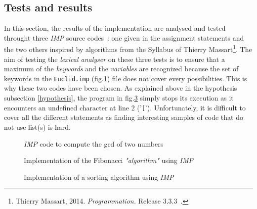 \documentclass[a4paper,11pt]{article}
\begin{document}
  \subsection{Tests and results}
    \label{subsec:testscanner}
    In this section, the results of the implementation are analysed and tested throught three \textit{IMP} source codes~: one given in the assignment statements and the two others inspired by algorithms from the Syllabus of Thierry Massart\footnote{Thierry Massart, 2014. \textit{Programmation.} Release 3.3.3~.}. The aim of testing the \textit{lexical analyser} on these three tests is to ensure that a maximum of the \textit{keywords} and the \textit{variables} are recognized because the set of keywords in the \verb|Euclid.imp| (fig.\ref{code:euclid}) file does not cover every possibilities. This is why these two codes have been chosen. As explained above in the hypothesis subsection \ref{hypothesis}, the program in fig.\ref{code:sort} simply stops its execution as it encounters an undefined character at line 2 ('\verb|[|'). Unfortunately, it is difficult to cover all the different statements as finding interesting samples of code that do not use list(s) is hard.
    \begin{figure}[h!] %
      
      \caption{\textit{IMP} code to compute the gcd of two numbers}
      \label{code:euclid}
    \end{figure}
    \begin{figure}[h!]
      
      \caption{Implementation of the Fibonacci \textit{"algorithm"} using \textit{IMP}}
      \label{code:fibonacci}
    \end{figure}
    \begin{figure}[h!]
      
      \caption{Implementation of a sorting algorithm using \textit{IMP}}
      \label{code:sort}
    \end{figure}
    
\end{document}
